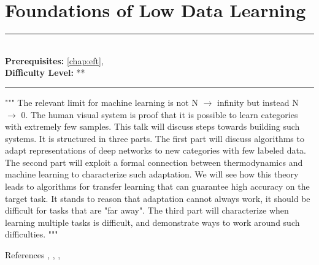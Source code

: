 \documentclass[book.tex]{subfiles}
\begin{document}
\chapter{Foundations of Low Data Learning}
\label{chap:low_data}
\noindent\rule{11cm}{0.4pt} \\
\textbf{Prerequisites:}  \autoref{chap:eft},   \\
\textbf{Difficulty Level:} ** \\
\noindent\rule{11cm}{0.4pt}
\vspace{5mm}

"""
The relevant limit for machine learning is not N $\to$ infinity but instead N $\to$ 0. The human visual system is proof that it is possible to learn categories with extremely few samples. This talk will discuss steps towards building such systems. It is structured in three parts. The first part will discuss algorithms to adapt representations of deep networks to new categories with few labeled data. The second part will exploit a formal connection between thermodynamics and machine learning to characterize such adaptation. We will see how this theory leads to algorithms for transfer learning that can guarantee high accuracy on the target task. It stands to reason that adaptation cannot always work, it should be difficult for tasks that are "far away". The third part will characterize when learning multiple tasks is difficult, and demonstrate ways to work around such difficulties.
"""

References \cite{dhillon2019baseline}, \cite{gao2020free}, \cite{gao2021information}, \cite{ramesh2021boosting}
\end{document}

